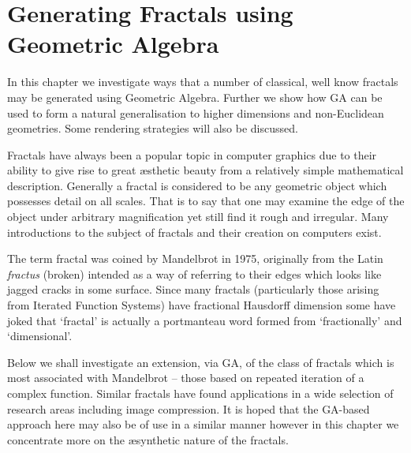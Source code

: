 \begin{savequote}
\end{savequote}

\chapter{Generating Fractals using Geometric Algebra}

In this chapter we investigate ways that a number of classical, well know
fractals may be generated using Geometric Algebra. Further we show how
GA can be used to form a natural generalisation to higher dimensions and
non-Euclidean geometries. Some rendering strategies will also be discussed.

Fractals have always been a popular topic in computer graphics due to their
ability to give rise to great \ae sthetic beauty from a relatively simple
mathematical description. Generally a fractal is considered to be any
geometric object which possesses detail on all
scales\cite{FRAC:FractalsEverywhere, FRAC:FractalGeometryOfNature}. That is to
say that one may examine the edge of the object under arbitrary magnification
yet still find it rough and irregular. Many introductions to the subject of
fractals and their creation on computers exist\cite{FRAC:FractalGeometry,
  FRAC:ChaosAndFractals, FRAC:FractalImages}.

The term fractal was coined by Mandelbrot\cite{FRAC:LesObjetsFractals} in 1975,
originally from the Latin {\em fractus} (broken) intended as a way of referring
to their edges which looks like jagged cracks in some surface. Since many
fractals (particularly those arising from Iterated Function Systems) have
fractional Hausdorff dimension\cite{FRAC:GeometryOfFractalSets}
some have joked that `fractal' is actually a portmanteau word formed from
`fractionally' and `dimensional'.

Below we shall investigate an extension, via GA, of the class of fractals 
which is most associated with Mandelbrot -- those based on repeated iteration
of a complex function.  Similar fractals have found applications in a wide
selection of research areas including image 
compression\cite{Barnsley88c,Barnsley93b}.%
It is hoped that the GA-based approach here may
also be of use in a similar manner however in this chapter we concentrate more
on the \ae synthetic nature of the fractals.

